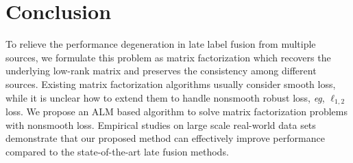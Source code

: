 \documentclass[letterpaper]{article}
\def\eg{{\emph{e.g.}}}
\def\eg{\emph{eg}}
\begin{document}
\section{Conclusion}

To relieve the performance degeneration in late label fusion from multiple sources, we formulate this problem as matrix factorization which recovers the underlying low-rank matrix and preserves the consistency among different sources.
Existing matrix factorization algorithms usually consider smooth loss, while it is unclear how to extend them to handle nonsmooth robust loss, \eg, $\ell_{1,2}$ loss.
We propose an ALM based algorithm to solve matrix factorization problems with nonsmooth loss.
Empirical studies on large scale real-world data sets demonstrate that our proposed method can effectively improve performance compared to the state-of-the-art late fusion methods.

\begin{quote}
\begin{small}
  
  
\end{small}
\end{quote}
\end{document}
